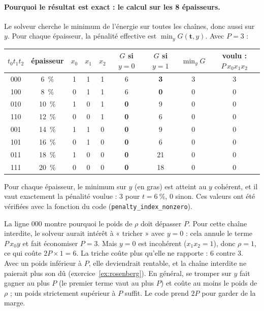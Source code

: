 \paragraph{Pourquoi le résultat est exact : le calcul sur les 8 épaisseurs.} Le solveur cherche le minimum de l'énergie sur toutes les chaînes, donc aussi sur $y$. Pour chaque épaisseur, la pénalité effective est $\min_yG(\mathbf t,y)$. Avec $P=3$ :
\begin{center}
\renewcommand{\arraystretch}{1.15}
\small
\begin{tabular}{cc ccc cc c c}
\toprule
$t_0t_1t_2$ & épaisseur & $x_0$ & $x_1$ & $x_2$ & $G$ si $y=0$ & $G$ si $y=1$ & $\min_yG$ & voulu : $P\,x_0x_1x_2$ \\
\midrule
000 & 6~\% & 1&1&1 & 6 & \textbf{3} & 3 & 3 \\
100 & 8~\% & 0&1&1 & 6 & \textbf{0} & 0 & 0 \\
010 & 10~\% & 1&0&1 & \textbf{0} & 9 & 0 & 0 \\
110 & 12~\% & 0&0&1 & \textbf{0} & 6 & 0 & 0 \\
001 & 14~\% & 1&1&0 & \textbf{0} & 9 & 0 & 0 \\
101 & 16~\% & 0&1&0 & \textbf{0} & 6 & 0 & 0 \\
011 & 18~\% & 1&0&0 & \textbf{0} & 21 & 0 & 0 \\
111 & 20~\% & 0&0&0 & \textbf{0} & 18 & 0 & 0 \\
\bottomrule
\end{tabular}
\end{center}
Pour chaque épaisseur, le minimum sur $y$ (en gras) est atteint au $y$ cohérent, et il vaut exactement la pénalité voulue : 3 pour $t=6~\%$, 0 sinon. Ces valeurs ont été vérifiées avec la fonction du code (\texttt{penalty\_index\_nonzero}).

La ligne $000$ montre pourquoi le poids de $\rho$ doit dépasser $P$. Pour cette chaîne interdite, le solveur aurait intérêt à « tricher » avec $y=0$ : cela annule le terme $P\,x_0y$ et fait économiser $P=3$. Mais $y=0$ est incohérent ($x_1x_2=1$), donc $\rho=1$, ce qui coûte $2P\times1=6$. La triche coûte plus qu'elle ne rapporte : 6 contre 3. Avec un poids inférieur à $P$, elle deviendrait rentable, et la chaîne interdite ne paierait plus son dû (exercice~\ref{ex:rosenberg}). En général, se tromper sur $y$ fait gagner au plus $P$ (le premier terme vaut au plus $P$) et coûte au moins le poids de $\rho$ ; un poids strictement supérieur à $P$ suffit. Le code prend $2P$ pour garder de la marge.

